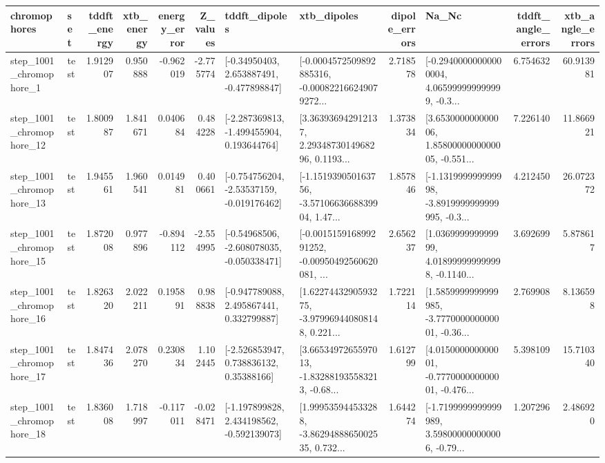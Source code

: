 \begin{tabular}{llrrrrllrlrr}
\toprule
             chromophores &       set &  tddft\_energy &  xtb\_energy &  energy\_error &  Z\_values &                               tddft\_dipoles &                                        xtb\_dipoles &  dipole\_errors &                                              Na\_Nc &  tddft\_angle\_errors &  xtb\_angle\_errors \\
\midrule
  step\_1001\_chromophore\_1 &      test &      1.912907 &    0.950888 &     -0.962019 & -2.775774 &    [-0.34950403, 2.653887491, -0.477898847] &  [-0.0004572509892885316, -0.000822166249079272... &       2.718578 &  [-0.29400000000000004, 4.065999999999999, -0.3... &            6.754632 &         60.913981 \\
 step\_1001\_chromophore\_12 &      test &      1.800987 &    1.841671 &      0.040684 &  0.484228 &   [-2.287369813, -1.499455904, 0.193644764] &  [3.363936942912137, 2.2934873014968296, 0.1193... &       1.373834 &  [3.653000000000006, 1.8580000000000005, -0.551... &            7.226140 &         11.866921 \\
 step\_1001\_chromophore\_13 &      test &      1.945561 &    1.960541 &      0.014981 &  0.400661 &   [-0.754756204, -2.53537159, -0.019176462] &  [-1.151939050163756, -3.5710663668839904, 1.47... &       1.857846 &  [-1.131999999999998, -3.8919999999999995, -0.3... &            4.212450 &         26.072372 \\
 step\_1001\_chromophore\_15 &      test &      1.872008 &    0.977896 &     -0.894112 & -2.554995 &   [-0.54968506, -2.608078035, -0.050338471] &  [-0.001515916899291252, -0.00950492560620081, ... &       2.656237 &  [1.036999999999999, 4.018999999999998, -0.1140... &            3.692699 &          5.878617 \\
 step\_1001\_chromophore\_16 &      test &      1.826320 &    2.022211 &      0.195891 &  0.988838 &    [-0.947789088, 2.495867441, 0.332799887] &  [1.6227443290593275, -3.979969440808148, 0.221... &       1.722114 &  [1.5859999999999985, -3.777000000000001, -0.36... &            2.769908 &          8.136598 \\
 step\_1001\_chromophore\_17 &      test &      1.847436 &    2.078270 &      0.230834 &  1.102445 &     [-2.526853947, 0.738836132, 0.35388166] &  [3.6653497265597013, -1.832881935583213, -0.68... &       1.612799 &  [4.015000000000001, -0.777000000000001, -0.476... &            5.398109 &         15.710340 \\
 step\_1001\_chromophore\_18 &      test &      1.836008 &    1.718997 &     -0.117011 & -0.028471 &   [-1.197899828, 2.434198562, -0.592139073] &  [1.999535944533288, -3.8629488865002535, 0.732... &       1.644274 &  [-1.7199999999999989, 3.598000000000006, -0.79... &            1.207296 &          2.486920 \\

\end{tabular}
